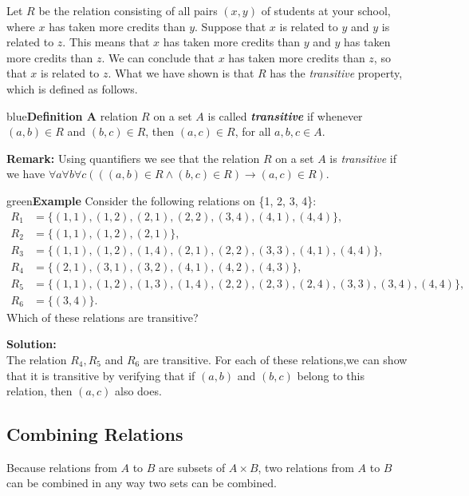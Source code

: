 \documentclass[11pt]{article}
\newenvironment{example}[1][\unskip]{\begin{mybox}{green}{\textbf{Example} {#1}}}{\end{mybox}}
\newenvironment{definition}[1]{\begin{mybox}{blue}{\textbf{Definition #1}}}{\end{mybox}}
\begin{document}
Let $R$ be the relation consisting of all pairs $(x, y)$ of students at your school, where $x$ has taken more credits than $y$. Suppose that $x$ is related to $y$ and $y$ is related to $z$. This means that $x$ has taken more credits than $y$ and $y$ has taken more credits than $z$. We can conclude that $x$ has taken more credits than $z$, so that $x$ is related to $z$. What we have shown is that $R$ has the \textit{transitive} property, which is defined as follows.

\begin{definition}{5}
A relation $R$ on a set $A$ is called \textbf{\textit{transitive}} if whenever $(a, b) \in R$ and $(b, c) \in R$, then $(a, c) \in R$, for all $a, b, c \in A$.
\end{definition}
\textbf{Remark:} Using quantifiers we see that the relation $R$ on a set $A$ is \textit{transitive} if we have $\forall a \forall b \forall c (((a, b) \in R \land (b, c) \in R) \rightarrow (a, c) \in R)$.

\begin{example}
Consider the following relations on \{1, 2, 3, 4\}:
\begin{align*}
    R_1 &= \{(1, 1), (1, 2), (2, 1), (2, 2), (3, 4), (4, 1), (4, 4)\},\\
    R_2 &= \{(1, 1), (1, 2), (2, 1)\},\\
    R_3 &= \{(1, 1), (1, 2), (1, 4), (2, 1), (2, 2), (3, 3), (4, 1), (4, 4)\},\\
    R_4 &= \{(2, 1), (3, 1), (3, 2), (4, 1), (4, 2), (4, 3)\},\\
    R_5 &= \{(1, 1), (1, 2), (1, 3), (1, 4), (2, 2), (2, 3), (2, 4), (3, 3), (3, 4), (4, 4)\},\\
    R_6 &= \{(3, 4)\}.
\end{align*}
Which of these relations are transitive?

\textbf{Solution:}\\
The relation $R_4, R_5$ and $R_6$ are transitive. For each of these relations,we can show that it is transitive by verifying that if $(a, b)$ and $(b, c)$ belong to this relation, then $(a, c)$ also does.
\end{example}

\subsection{Combining Relations}
Because relations from $A$ to $B$ are subsets of $A \times B$, two relations from $A$ to $B$ can be combined in any way two sets can be combined.
\end{document}
